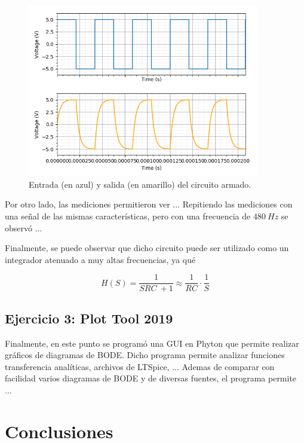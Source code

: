 \documentclass[a4paper]{article}
\begin{document}
\begin{figure}[H]
	\centering
	\includegraphics[width=0.9\textwidth]{Entrada-Salida.png}
\caption{Entrada (en azul) y salida (en amarillo) del circuito armado.}
	\label{fig:simu2}
\end{figure}

Por otro lado, las mediciones permitieron ver ...
Repitiendo las mediciones con una señal de las mismas características, pero con una frecuencia de $ 480 \ Hz $ se observó ...

Finalmente, se puede observar que dicho circuito puede ser utilizado como un integrador atenuado a muy altas frecuencias, ya qué

\begin{equation}
	H \left(S \right) = \frac{1}{SRC \ + 1} \approx \frac{1}{RC} \cdot \frac{1}{S}
\end{equation}

\subsection{Ejercicio 3: Plot Tool 2019}
Finalmente, en este punto se programó una GUI en Phyton que permite realizar gráficos de diagramas de BODE. Dicho programa permite analizar funciones transferencia analíticas, archivos de LTSpice, ... 
Ademas de comparar con facilidad varios diagramas de BODE y de diversas fuentes, el programa permite ...

\section{Conclusiones}
\end{document}
